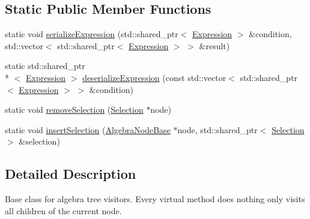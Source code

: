\subsection*{Static Public Member Functions}
\begin{DoxyCompactItemize}
\item 
static void \hyperlink{classrafe_1_1_algebra_visitor_a9d363c344928367680e60d1f7606ad06}{serialize\+Expression} (std\+::shared\+\_\+ptr$<$ \hyperlink{classrafe_1_1_expression}{Expression} $>$ \&condition, std\+::vector$<$ std\+::shared\+\_\+ptr$<$ \hyperlink{classrafe_1_1_expression}{Expression} $>$ $>$ \&result)
\item 
static std\+::shared\+\_\+ptr\\*
$<$ \hyperlink{classrafe_1_1_expression}{Expression} $>$ \hyperlink{classrafe_1_1_algebra_visitor_aee992f1216f75570dc7073f5031ecf7f}{deserialize\+Expression} (const std\+::vector$<$ std\+::shared\+\_\+ptr$<$ \hyperlink{classrafe_1_1_expression}{Expression} $>$ $>$ \&condition)
\item 
static void \hyperlink{classrafe_1_1_algebra_visitor_a1de5a4866096b3da07f921d351f437e7}{remove\+Selection} (\hyperlink{classrafe_1_1_selection}{Selection} $\ast$node)
\item 
static void \hyperlink{classrafe_1_1_algebra_visitor_a4eb384d25bff8d19c3d0d7310d33bf81}{insert\+Selection} (\hyperlink{classrafe_1_1_algebra_node_base}{Algebra\+Node\+Base} $\ast$node, std\+::shared\+\_\+ptr$<$ \hyperlink{classrafe_1_1_selection}{Selection} $>$ \&selection)
\end{DoxyCompactItemize}


\subsection{Detailed Description}
Base class for algebra tree visitors. Every virtual method does nothing only visits all children of the current node. 

